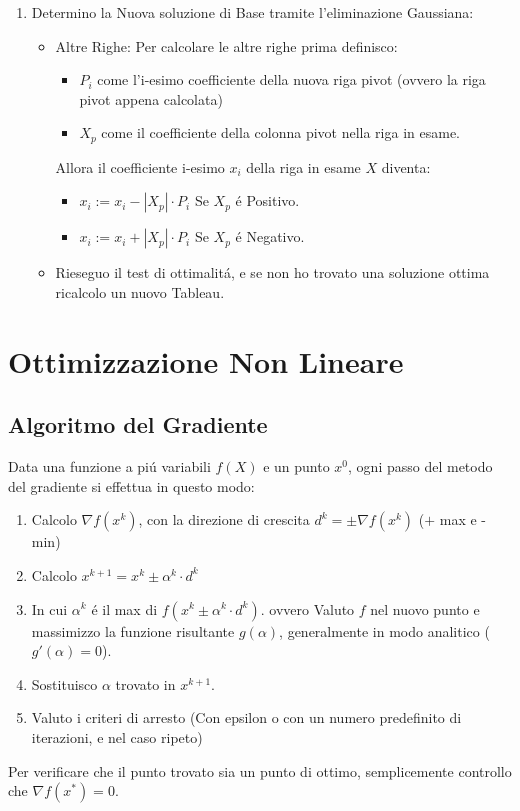\documentclass[12pt, a4paper, openany]{book}
\begin{document}
\begin{enumerate}
	\item Determino la Nuova soluzione di Base tramite l'eliminazione Gaussiana:
	      \begin{itemize}
		      \item Altre Righe: Per calcolare le altre righe prima definisco:
		            \begin{itemize}
			            \item $P_i$ come l'i-esimo coefficiente della nuova riga pivot (ovvero la riga pivot appena calcolata)
			            \item $X_p$ come il coefficiente della colonna pivot nella riga in esame.
		            \end{itemize}
		            Allora il coefficiente i-esimo $x_i$ della riga in esame $X$ diventa:
		            \begin{itemize}
			            \item $x_i := x_i - |X_p|\cdot P_i$ Se $X_p$ é Positivo.
			            \item $x_i := x_i + |X_p|\cdot P_i$ Se $X_p$ é Negativo.
		            \end{itemize}
		      \item Rieseguo il test di ottimalitá, e se non ho trovato una soluzione ottima ricalcolo un nuovo Tableau.
	      \end{itemize}

\end{enumerate}

\chapter{Ottimizzazione Non Lineare}
\section{Algoritmo del Gradiente}
Data una funzione a piú variabili $f(X)$ e un punto $x^0$, ogni passo del metodo del gradiente si effettua in questo modo:
\begin{enumerate}
	\item Calcolo $\nabla f(x^k)$, con la direzione di crescita $d^k=\pm \nabla f(x^k)$ ($+$ max e - min)
	\item Calcolo $x^{k+1} = x^k \pm \alpha^k \cdot d^k$
	\item In cui $\alpha^k$ é il max di $f(x^k \pm \alpha^k \cdot d^k)$. ovvero
	      Valuto $f$ nel nuovo punto e massimizzo la funzione risultante $g(\alpha)$, generalmente in modo analitico ($g'(\alpha)=0$).
	\item Sostituisco $\alpha$ trovato in $x^{k+1}$.
	\item Valuto i criteri di arresto (Con epsilon o con un numero predefinito di iterazioni, e nel caso ripeto)
\end{enumerate}
Per verificare che il punto trovato sia un punto di ottimo, semplicemente controllo che $\nabla f(x^*) = 0$.
\pagebreak
\end{document}
